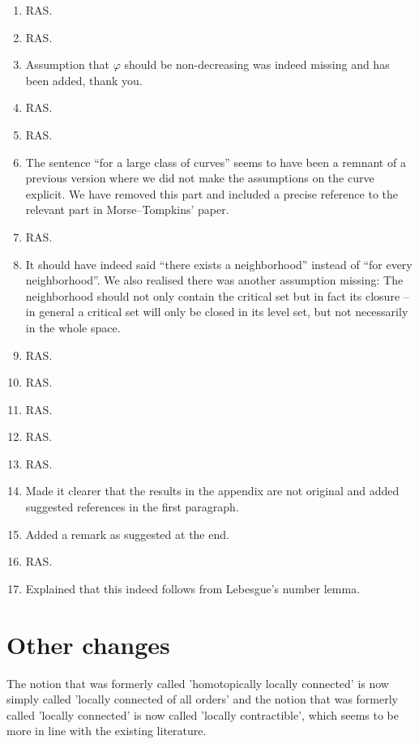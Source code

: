 \documentclass{article}
\begin{document}
\begin{enumerate}
		\item RAS.
		\item RAS.
		\item Assumption that $\varphi$ should be non-decreasing was indeed missing and has been added, thank you.
		\item RAS.
		\item RAS.
		\item The sentence ``for a large class of curves'' seems to have been a remnant of a previous version where we did not make the assumptions on the curve explicit. We have removed this part and included a precise reference to the relevant part in Morse--Tompkins' paper.
		\item RAS.
		\item It should have indeed said ``there exists a neighborhood'' instead of ``for every neighborhood''. We also realised there was another assumption missing: The neighborhood should not only contain the critical set but in fact its closure -- in general a critical set will only be closed in its level set, but not necessarily in the whole space.
		\item RAS.
		\item RAS.
		\item RAS.
		\item RAS.
		\item RAS.
		\item Made it clearer that the results in the appendix are not original and added suggested references in the first paragraph.
		\item Added a remark as suggested at the end.
		\item RAS.
		\item Explained that this indeed follows from Lebesgue's number lemma.
	\end{enumerate}
	
	\section{Other changes}
	The notion that was formerly called 'homotopically locally connected' is now simply called 'locally connected of all orders' and the notion that was formerly called 'locally connected' is now called 'locally contractible', which seems to be more in line with the existing literature.
\end{document}
